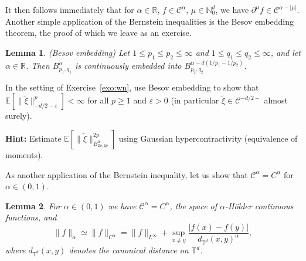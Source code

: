 \documentclass[a4paper,11pt]{article}
\newcommand{\tmtextbf}[1]{{\bfseries{#1}}}
\newtheorem{lemma}{Lemma}
{\theorembodyfont{\rmfamily}\newtheorem{remark}{Remark}}
\newcommand{\CC}{\mathscr{C}}
\begin{document}
It then follows immediately that for $\alpha \in \mathbb{R}$, $f \in
\CC^{\alpha}$, ${\mu} \in \mathbb{N}^d_0$, we have $\partial^{{\mu}}
f \in \CC^{\alpha - | {\mu} |}$. Another simple application of the
Bernstein inequalities is the Besov embedding theorem, the proof of which we
leave as an exercise.

\begin{lemma}
  \label{lem:besov embedding}(Besov embedding) Let $1 \leqslant p_1 \leqslant
  p_2 \leqslant \infty$ and $1 \leqslant q_1 \leqslant q_2 \leqslant \infty$,
  and let $\alpha \in \mathbb{R}$. Then $B^{\alpha}_{p_1, q_1}$ is
  continuously embedded into $B^{\alpha - d (1 / p_1 - 1 / p_2)}_{p_2, q_2}$.
\end{lemma}

\begin{exercise}
  \label{exo:wn besov}In the setting of Exercise~\ref{exo:wn}, use Besov
  embedding to show that $\mathbb{E} [\| \tilde{\xi}
  \|_{- d / 2 - \varepsilon}^p] < \infty$ for all $p \geqslant 1$ and
  $\varepsilon > 0$ (in particular $\tilde{\xi} \in \CC^{- d / 2 -}$ almost
  surely).
  
  \tmtextbf{Hint:} Estimate $\mathbb{E} [\| \tilde{\xi} \|_{B^{\alpha}_{2 p,
  2 p}}^{2 p}]$ using Gaussian hypercontractivity (equivalence of moments).
\end{exercise}

As another application of the Bernstein inequality, let us show that
$\CC^{\alpha} = C^{\alpha}$ for $\alpha \in (0, 1)$.

\begin{lemma}
  For $\alpha \in (0, 1)$ we have $\CC^{\alpha} = C^{\alpha}$, the space of
  $\alpha$-H{\"o}lder continuous functions, and
  \[ \| f \|_{\alpha} \simeq \| f \|_{C^{\alpha}} = \| f \|_{L^{\infty}} +
     \sup_{x \neq y} \frac{| f (x) - f (y) |}{d_{\mathbb{T}^d} (x,
     y)^{\alpha}}, \]
  where $d_{\mathbb{T}^d} (x, y)$ denotes the canonical distance on
  $\mathbb{T}^d$.
\end{lemma}
\end{document}
